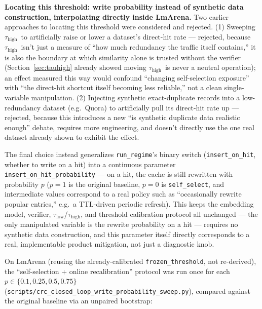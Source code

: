 \documentclass[11pt]{article}
\newcommand{\taulow}{\ensuremath{\tau_{\text{low}}}}
\newcommand{\tauhigh}{\ensuremath{\tau_{\text{high}}}}
\begin{document}
\textbf{Locating this threshold: write probability instead of synthetic data construction, interpolating directly inside LmArena.} Two earlier approaches to locating this threshold were considered and rejected. (1) Sweeping \tauhigh\ to artificially raise or lower a dataset's direct-hit rate --- rejected, because \tauhigh\ isn't just a measure of ``how much redundancy the traffic itself contains,'' it is also the boundary at which similarity alone is trusted without the verifier (Section~\ref{sec:tauhigh} already showed moving \tauhigh\ is never a neutral operation); an effect measured this way would confound ``changing self-selection exposure'' with ``the direct-hit shortcut itself becoming less reliable,'' not a clean single-variable manipulation. (2) Injecting synthetic exact-duplicate records into a low-redundancy dataset (e.g.\ Quora) to artificially pull its direct-hit rate up --- rejected, because this introduces a new ``is synthetic duplicate data realistic enough'' debate, requires more engineering, and doesn't directly use the one real dataset already shown to exhibit the effect.

The final choice instead generalizes \texttt{run\_\allowbreak{}regime}'s binary switch (\texttt{insert\_\allowbreak{}on\_\allowbreak{}hit}, whether to write on a hit) into a continuous parameter \texttt{insert\_\allowbreak{}on\_\allowbreak{}hit\_\allowbreak{}probability} --- on a hit, the cache is still rewritten with probability $p$ ($p=1$ is the original baseline, $p=0$ is \texttt{self\_\allowbreak{}select}, and intermediate values correspond to a real policy such as ``occasionally rewrite popular entries,'' e.g.\ a TTL-driven periodic refresh). This keeps the embedding model, verifier, \taulow/\tauhigh, and threshold calibration protocol all unchanged --- the only manipulated variable is the rewrite probability on a hit --- requires no synthetic data construction, and this parameter itself directly corresponds to a real, implementable product mitigation, not just a diagnostic knob.

On LmArena (reusing the already-calibrated \texttt{frozen\_\allowbreak{}threshold}, not re-derived), the ``self-selection + online recalibration'' protocol was run once for each $p \in \{0.1, 0.25, 0.5, 0.75\}$ (\texttt{scripts/\allowbreak{}crc\_\allowbreak{}closed\_\allowbreak{}loop\_\allowbreak{}write\_\allowbreak{}probability\_\allowbreak{}sweep.\allowbreak{}py}), compared against the original baseline via an unpaired bootstrap:
\end{document}
